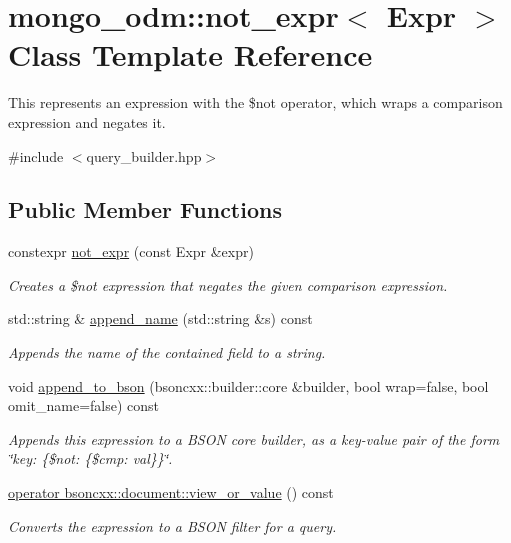 \hypertarget{classmongo__odm_1_1not__expr}{}\section{mongo\+\_\+odm\+:\+:not\+\_\+expr$<$ Expr $>$ Class Template Reference}
\label{classmongo__odm_1_1not__expr}


This represents an expression with the \$not operator, which wraps a comparison expression and negates it.  




{\ttfamily \#include $<$query\+\_\+builder.\+hpp$>$}

\subsection*{Public Member Functions}
\begin{DoxyCompactItemize}
\item 
constexpr \hyperlink{classmongo__odm_1_1not__expr_addb4f3618f5a03fefe5be5bfed40abd9}{not\+\_\+expr} (const Expr \&expr)
\begin{DoxyCompactList}\small\item\em Creates a \$not expression that negates the given comparison expression. \end{DoxyCompactList}\item 
std\+::string \& \hyperlink{classmongo__odm_1_1not__expr_a6ebabf0dd6a38619d9fd8cae17b2894e}{append\+\_\+name} (std\+::string \&s) const \hypertarget{classmongo__odm_1_1not__expr_a6ebabf0dd6a38619d9fd8cae17b2894e}{}\label{classmongo__odm_1_1not__expr_a6ebabf0dd6a38619d9fd8cae17b2894e}

\begin{DoxyCompactList}\small\item\em Appends the name of the contained field to a string. \end{DoxyCompactList}\item 
void \hyperlink{classmongo__odm_1_1not__expr_a8bcedeb398b0c4e09156735c4e355f4b}{append\+\_\+to\+\_\+bson} (bsoncxx\+::builder\+::core \&builder, bool wrap=false, bool omit\+\_\+name=false) const 
\begin{DoxyCompactList}\small\item\em Appends this expression to a B\+S\+ON core builder, as a key-\/value pair of the form \char`\"{}key\+: \{\$not\+: \{\$cmp\+: val\}\}\char`\"{}. \end{DoxyCompactList}\item 
\hyperlink{classmongo__odm_1_1not__expr_ae25409383877731aaa45ed28c31b91c8}{operator bsoncxx\+::document\+::view\+\_\+or\+\_\+value} () const 
\begin{DoxyCompactList}\small\item\em Converts the expression to a B\+S\+ON filter for a query. \end{DoxyCompactList}\end{DoxyCompactItemize}


